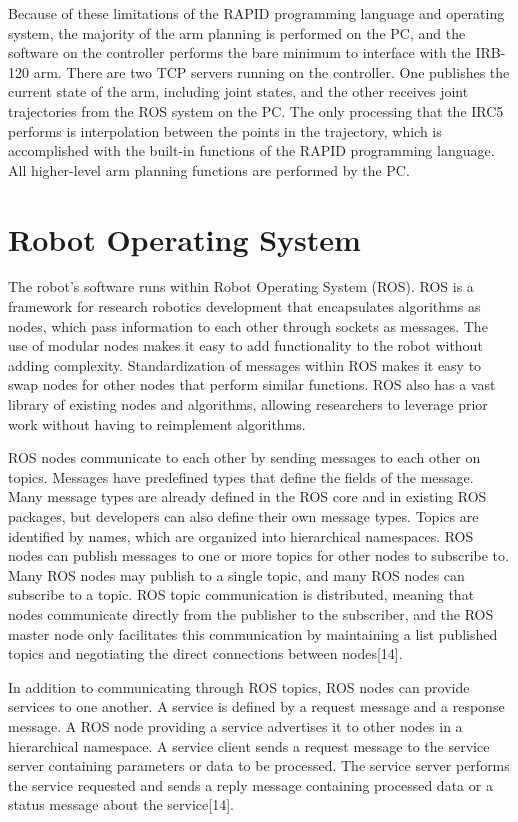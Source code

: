 \documentclass[]{cwru} %
\begin{document}
Because of these limitations of the RAPID programming language and
operating system, the majority of the arm planning is performed on the
PC, and the software on the controller performs the bare minimum to
interface with the IRB-120 arm. There are two TCP servers running on the
controller. One publishes the current state of the arm, including joint
states, and the other receives joint trajectories from the ROS system on
the PC. The only processing that the IRC5 performs is interpolation
between the points in the trajectory, which is accomplished with the
built-in functions of the RAPID programming language. All higher-level
arm planning functions are performed by the PC.

\section{Robot Operating System}

The robot's software runs within Robot Operating System (ROS). ROS is a
framework for research robotics development that encapsulates algorithms
as nodes, which pass information to each other through sockets as
messages. The use of modular nodes makes it easy to add functionality to
the robot without adding complexity. Standardization of messages within
ROS makes it easy to swap nodes for other nodes that perform similar
functions. ROS also has a vast library of existing nodes and algorithms,
allowing researchers to leverage prior work without having to
reimplement algorithms.

ROS nodes communicate to each other by sending messages to each other on
topics. Messages have predefined types that define the fields of the
message. Many message types are already defined in the ROS core and in
existing ROS packages, but developers can also define their own message
types. Topics are identified by names, which are organized into
hierarchical namespaces. ROS nodes can publish messages to one or more
topics for other nodes to subscribe to. Many ROS nodes may publish to a
single topic, and many ROS nodes can subscribe to a topic. ROS topic
communication is distributed, meaning that nodes communicate directly
from the publisher to the subscriber, and the ROS master node only
facilitates this communication by maintaining a list published topics
and negotiating the direct connections between nodes{[}14{]}.

In addition to communicating through ROS topics, ROS nodes can provide
services to one another. A service is defined by a request message and a
response message. A ROS node providing a service advertises it to other
nodes in a hierarchical namespace. A service client sends a request
message to the service server containing parameters or data to be
processed. The service server performs the service requested and sends a
reply message containing processed data or a status message about the
service{[}14{]}.
\end{document}
